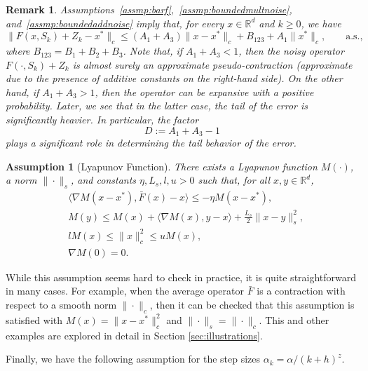 \documentclass{article}
\newtheorem{remark}{Remark}
\newtheorem{assmp}{Assumption}
\begin{document}
\begin{remark}\label{rem:a13significance}
Assumptions~\ref{assmp:barf},~\ref{assmp:boundedmultnoise}, and~\ref{assmp:boundedaddnoise} imply that, for every $x\in\mathbb{R}^d$ and $k\geq 0$, we have
\[ \|F(x,S_k) + Z_k - x^*\|_c \le (A_1 + A_3) \|x-x^*\|_c + B_{123} + A_1\|x^*\|_c, \qquad \text{a.s.}, \]
where $B_{123} = B_1+B_2+B_3$. Note that, if $A_{1} + A_3 < 1$, then the noisy operator $F(\cdot, S_k) + Z_k$ is almost surely an approximate pseudo-contraction (approximate due to the presence of additive constants on the right-hand side). On the other hand, if $A_{1} + A_3 > 1$, then the operator can be expansive with a positive probability. Later, we see that in the latter case, the tail of the error is significantly heavier. In particular, the factor
\begin{equation}\label{eq:def_D}
    D := A_{1} + A_3 - 1
\end{equation}
plays a significant role in determining the tail behavior of the error. 
\end{remark}

\begin{assmp}[Lyapunov Function]\label{assmp:lyapunov} There exists a Lyapunov function $M(\cdot)$, a norm $\|\cdot\|_s$, and constants $\eta, L_s, l, u > 0$ such that, for all $x,y \in \mathbb{R}^d$,
    \begin{align}
        &\langle \nabla M(x-x^*), \bar{F}(x) - x \rangle \le -\eta M(x-x^*), \label{eq:negdrift}\\
        & M(y) \le M(x) + \langle \nabla M(x), y-x \rangle + \frac{L_s}{2} \|x-y\|^2_s, \label{eq:Smoothness}\\
        & l M(x) \le \|x\|^2_c \le u M(x), \label{eq:normMcM} \\
        & \nabla M(0) = 0. \label{eq:0gradatmin} 
    \end{align}
\end{assmp}

While this assumption seems hard to check in practice, it is quite straightforward in many cases. For example, when the average operator $\bar{F}$ is a contraction with respect to a smooth norm $\|\cdot\|_c$, then it can be checked that this assumption is satisfied with $M(x)=\|x-x^*\|_c^2$ and $\|\cdot\|_s=\|\cdot\|_c$. This and other examples are explored in detail in Section \ref{sec:illustrations}.

\medskip

Finally, we have the following assumption for the step sizes $\alpha_k=\alpha/(k+h)^z$.
\end{document}
